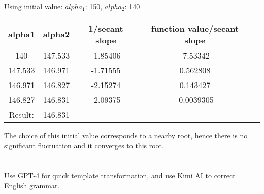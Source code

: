\documentclass[a4paper]{article}
\begin{document}
\begin{center}
Using initial value: $alpha_1$: 150, $alpha_2$: 140\\
\begin{tabular}{|c|c|c|c|c|}
\hline
alpha1 & alpha2 & 1/secant slope & function value/secant slope \\
\hline
140 & 147.533 & -1.85406 & -7.53342 \\
147.533 & 146.971 & -1.71555 & 0.562808 \\
146.971 & 146.827 & -2.15274 & 0.143427 \\
146.827 & 146.831 & -2.09375 & -0.0039305 \\
\hline
Result: & 146.831 & & \\
\hline
\end{tabular}
\end{center}
The choice of this initial value corresponds to a nearby root, hence there is no significant fluctuation and it converges to this root.

\section*{  }
Use GPT-4 for quick template transformation, and use Kimi AI to correct English grammar.
\end{document}
